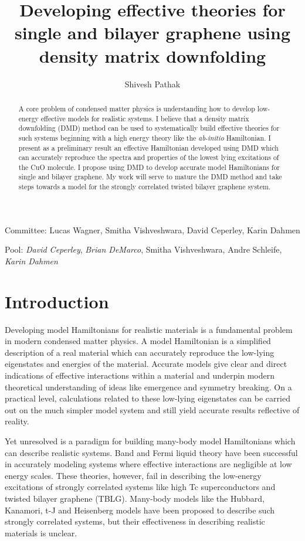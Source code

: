 \documentclass[12pt]{article}
\author{Shivesh Pathak}
\title{Developing effective theories for single and bilayer graphene using density matrix downfolding}
\begin{document}
\maketitle
\begin{abstract}
A core problem of condensed matter physics is understanding how to develop low-energy effective models for realistic systems.
I believe that a density matrix downfolding (DMD) method can be used to systematically build effective theories for such systems beginning with a high energy theory like the \textit{ab-initio} Hamiltonian.
I present as a preliminary result an effective Hamiltonian developed using DMD which can accurately reproduce the spectra and properties of the lowest lying excitations of the CuO molecule.
I propose using DMD to develop accurate model Hamiltonians for single and bilayer graphene.
My work will serve to mature the DMD method and take steps towards a model for the strongly correlated twisted bilayer graphene system.
\end{abstract}
Committee: Lucas Wagner, Smitha Vishveshwara, David Ceperley, Karin Dahmen

Pool: \textit{David Ceperley},\textit{ Brian DeMarco}, Smitha Vishveshwara, Andre Schleife, \textit{Karin Dahmen} 
\pagebreak

\section{Introduction}
Developing model Hamiltonians for realistic materials is a fundamental problem in modern condensed matter physics.
A model Hamiltonian is a simplified description of a real material which can accurately reproduce the low-lying eigenstates and energies of the material.
Accurate models give clear and direct indications of effective interactions within a material and underpin modern theoretical understanding of ideas like emergence and symmetry breaking.
On a practical level, calculations related to these low-lying eigenstates can be carried out on the much simpler model system and still yield accurate results reflective of reality.

Yet unresolved is a paradigm for building many-body model Hamiltonians which can describe realistic systems.
Band and Fermi liquid theory have been successful in accurately modeling systems where effective interactions are negligible at low energy scales.
These theories, however, fail in describing the low-energy excitations of strongly correlated systems like high Tc superconductors and twisted bilayer graphene (TBLG).
Many-body models like the Hubbard, Kanamori, t-J and Heisenberg models have 
been proposed to describe such strongly correlated systems, but their effectiveness in describing realistic materials is unclear.
\end{document}
